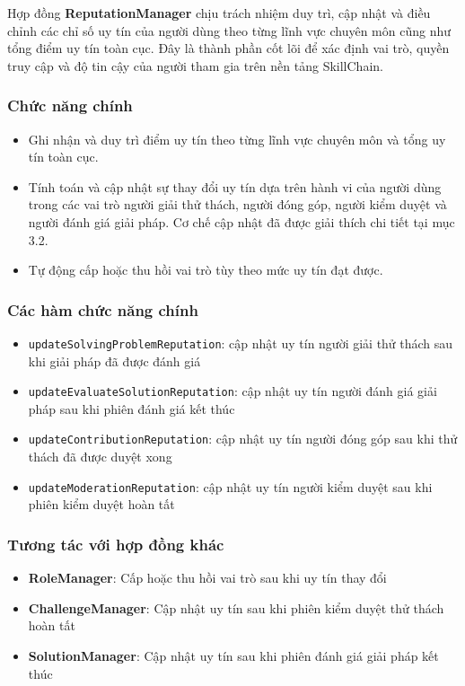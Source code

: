 Hợp đồng \textbf{ReputationManager} chịu trách nhiệm duy trì, cập nhật và điều chỉnh các chỉ số uy tín của người dùng theo từng lĩnh vực chuyên môn cũng như tổng điểm uy tín toàn cục.
Đây là thành phần cốt lõi để xác định vai trò, quyền truy cập và độ tin cậy của người tham gia trên nền tảng SkillChain.

\subsubsection{Chức năng chính}

\begin{itemize}
  \item Ghi nhận và duy trì điểm uy tín theo từng lĩnh vực chuyên môn và tổng uy tín toàn cục.
  \item Tính toán và cập nhật sự thay đổi uy tín dựa trên hành vi của người dùng trong các vai trò người giải thử thách, người đóng góp, người kiểm duyệt và người đánh giá giải pháp. Cơ chế cập nhật đã được giải thích chi tiết tại mục 3.2.
  \item Tự động cấp hoặc thu hồi vai trò tùy theo mức uy tín đạt được.
\end{itemize}

\subsubsection{Các hàm chức năng chính}

\begin{itemize}
  \item \texttt{updateSolvingProblemReputation}: cập nhật uy tín người giải thử thách sau khi giải pháp đã được đánh giá
  \item \texttt{updateEvaluateSolutionReputation}: cập nhật uy tín người đánh giá giải pháp sau khi phiên đánh giá kết thúc
  \item \texttt{updateContributionReputation}: cập nhật uy tín người đóng góp sau khi thử thách đã được duyệt xong
  \item \texttt{updateModerationReputation}: cập nhật uy tín người kiểm duyệt sau khi phiên kiểm duyệt hoàn tất
\end{itemize}

\subsubsection{Tương tác với hợp đồng khác}

\begin{itemize}
  \item \textbf{RoleManager}: Cấp hoặc thu hồi vai trò sau khi uy tín thay đổi
  \item \textbf{ChallengeManager}: Cập nhật uy tín sau khi phiên kiểm duyệt thử thách hoàn tất
  \item \textbf{SolutionManager}: Cập nhật uy tín sau khi phiên đánh giá giải pháp kết thúc
\end{itemize}

